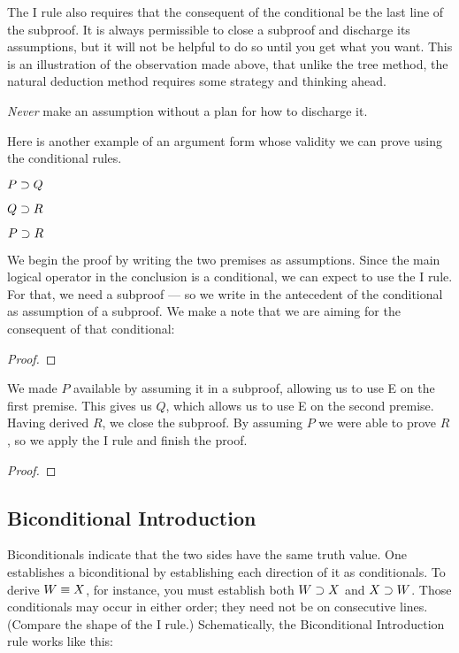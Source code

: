 The {\eif}I rule also requires that the consequent of the conditional be the last line of the subproof. It is always permissible to close a subproof and discharge its assumptions, but it will not be helpful to do so until you get what you want. This is an illustration of the observation made above, that unlike the tree method, the natural deduction method requires some strategy and thinking ahead.

\emph{Never} make an assumption without a plan for how to discharge it.

Here is another example of an argument form whose validity we can prove using the conditional rules.


\begin{earg}
\item[] $P \supset Q$
\item[] $Q \supset R$
\item[\therefore] $P \supset R$
\end{earg}
We begin the proof by writing the two premises as assumptions. Since the main logical operator in the conclusion is a conditional, we can expect to use the {\eif}I rule. For that, we need a subproof --- so we write in the antecedent of the conditional as assumption of a subproof. We make a note that we are aiming for the consequent of that conditional:

\begin{proof}
	\open
		 
	\close
\end{proof}

We made $P$ available by assuming it in a subproof, allowing us to use {\eif}E on the first premise. This gives us $Q$, which allows us to use {\eif}E on the second premise. Having derived $R$, we close the subproof. By assuming $P$ we were able to prove $R$, so we apply the {\eif}I rule and finish the proof.
\label{HSproof}
\begin{proof}
	\open
	\close
\end{proof}




\subsection{Biconditional Introduction}
Biconditionals indicate that the two sides have the same truth value. One establishes a biconditional by establishing each direction of it as conditionals. To derive $W \equiv X$, for instance, you must establish both $W \supset X$ and $X \supset W$. Those conditionals may occur in either order; they need not be on consecutive lines. (Compare the shape of the {\eand}I rule.) Schematically, the Biconditional Introduction rule works like this:

